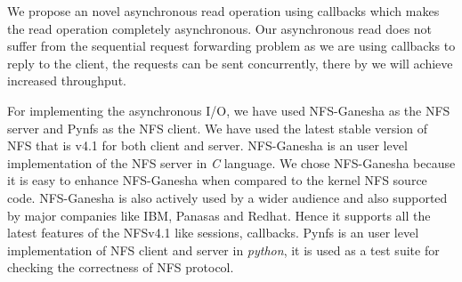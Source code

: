 	We propose an novel asynchronous read operation using callbacks which makes the read operation completely asynchronous. Our asynchronous read does not suffer from the sequential request forwarding problem as we are using callbacks to reply to the client, the requests can be sent concurrently, there by we will achieve increased throughput. 

For implementing the asynchronous I/O, we have used NFS-Ganesha \cite{ganesha} as the NFS server and Pynfs \cite{pynfs} as the NFS client. We have used the latest stable version of NFS that is v4.1 for both client and server. NFS-Ganesha is an user level implementation of the NFS server in \textit{C} language. We chose NFS-Ganesha because it is easy to enhance NFS-Ganesha when compared to the kernel NFS source code. NFS-Ganesha is also actively used by a wider audience and also supported by major companies like IBM, Panasas and Redhat. Hence it supports all the latest features of the NFSv4.1 like sessions, callbacks. Pynfs is an user level implementation of NFS client and server in \textit{python}, it is used as a test suite for checking the correctness of NFS protocol.

